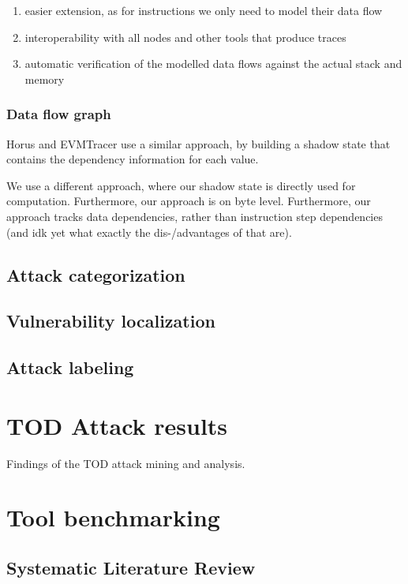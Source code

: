 \documentclass[draft,final]{vutinfth} %
\begin{document}
\begin{enumerate}
    \item easier extension, as for instructions we only need to model their data flow
    \item interoperability with all nodes and other tools that produce traces
    \item automatic verification of the modelled data flows against the actual stack and memory
\end{enumerate}

\subsection{Data flow graph}

Horus and EVMTracer use a similar approach, by building a shadow state that contains the dependency information for each value.

We use a different approach, where our shadow state is directly used for computation. Furthermore, our approach is on byte level. Furthermore, our approach tracks data dependencies, rather than instruction step dependencies (and idk yet what exactly the dis-/advantages of that are).

\section{Attack categorization}

\section{Vulnerability localization}

\section{Attack labeling}

\chapter{TOD Attack results}

Findings of the TOD attack mining and analysis.

\chapter{Tool benchmarking}

\section{Systematic Literature Review}
\end{document}
